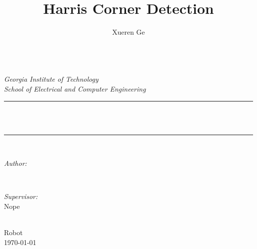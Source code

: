 \documentclass[12pt, a4 paper]{article}
\title{Harris Corner Detection}
\author{\textup{Xueren Ge}}
\begin{document}
\begin{titlepage}
	\newcommand{\HRule}{\rule{\linewidth}{0.5mm}}
	\center 
	\quad\\[1.5cm]
	\textsl{\Large Georgia Institute of Technology }\\[0.5cm] 
	\textsl{\large School of Electrical and Computer Engineering}\\[0.5cm] 
	\makeatletter
	\HRule \\[0.4cm]
	{ \huge \bfseries \@title}\\[0.4cm] 
	\HRule \\[1.5cm]
	\begin{minipage}{0.4\textwidth}
		\begin{flushleft} \large
			\emph{Author:}\\
			\@author
		\end{flushleft}
    \end{minipage}
    ~
	\begin{minipage}{0.4\textwidth}
		\begin{flushright} \large
			\emph{Supervisor:} \\
			\textup{Nope}
		\end{flushright}
	\end{minipage}\\[3cm]
	\makeatother
	{\large Robot}\\[0.5cm]
	{\large \today}\\[2cm] 
	\vfill 
\end{titlepage}
\end{document}
